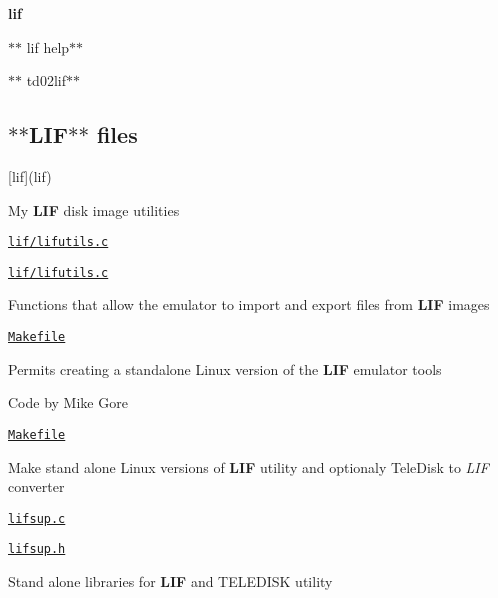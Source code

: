 \begin{DoxyItemize}
\item {\bfseries lif}
\item $\ast$$\ast$ lif help$\ast$$\ast$
\item $\ast$$\ast$ td02lif$\ast$$\ast$
\end{DoxyItemize}





\subsection*{$\ast$$\ast$\+L\+I\+F$\ast$$\ast$ files}


\begin{DoxyItemize}
\item \mbox{[}lif\mbox{]}(lif)
\begin{DoxyItemize}
\item My {\bfseries L\+IF} disk image utilities
\item \href{lif/lifutils.c}{\tt lif/lifutils.\+c}
\item \href{lif/lifutils.c}{\tt lif/lifutils.\+c}
\begin{DoxyItemize}
\item Functions that allow the emulator to import and export files from {\bfseries L\+IF} images
\end{DoxyItemize}
\item \href{lif/Makefile}{\tt Makefile}
\begin{DoxyItemize}
\item Permits creating a standalone Linux version of the {\bfseries L\+IF} emulator tools
\end{DoxyItemize}
\item Code by Mike Gore
\begin{DoxyItemize}
\item \href{lif/Makefile}{\tt Makefile}
\begin{DoxyItemize}
\item Make stand alone Linux versions of {\bfseries L\+IF} utility and optionaly Tele\+Disk to {\itshape L\+IF} converter
\end{DoxyItemize}
\item \href{lif/lifsup.c}{\tt lifsup.\+c}
\item \href{lif/lifsup.h}{\tt lifsup.\+h}
\begin{DoxyItemize}
\item Stand alone libraries for {\bfseries L\+IF} and T\+E\+L\+E\+D\+I\+SK utility
\begin{DoxyItemize}

\end{DoxyItemize}
\end{DoxyItemize}
\end{DoxyItemize}
\end{DoxyItemize}
\end{DoxyItemize}
